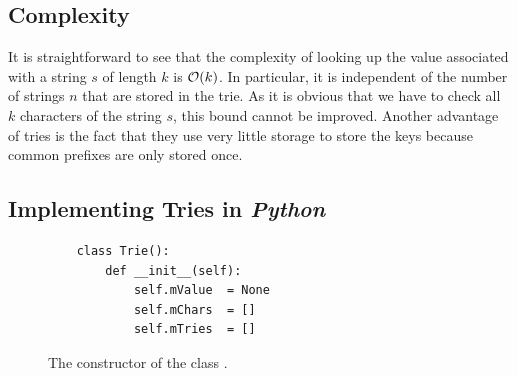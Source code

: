 \subsection{Complexity}
It is straightforward to see that the complexity of looking up the value associated with a string
$s$ of length $k$ is $\mathcal{O}(k)$.  In particular, it is independent of the number of strings $n$ that are stored in
the trie.
As it is obvious that we have to check all $k$ characters of the string $s$, this bound cannot be
improved.   Another advantage of tries is the fact that they use very little storage to store the
keys because common prefixes are only stored once. 

\subsection{Implementing Tries in \textsl{Python}}
\begin{figure}[!ht]
\centering
\begin{verbatim}
    class Trie(): 
        def __init__(self):
            self.mValue  = None
            self.mChars  = []
            self.mTries  = []
\end{verbatim}
\vspace*{-0.3cm}
\caption{The constructor of the class .}
\label{fig:trie.ipython-outline}
\end{figure}

